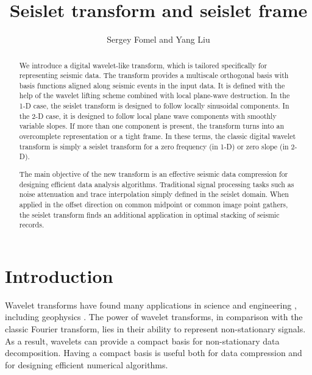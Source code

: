 \title{Seislet transform and seislet frame}
\author{Sergey Fomel and Yang Liu}



\address{Bureau of Economic Geology \\
John A. and Katherine G. Jackson School of Geosciences \\
The University of Texas at Austin \\
University Station, Box X \\
Austin, TX 78713-8924}

\maketitle

\begin{abstract}
  We introduce a digital wavelet-like transform, which is tailored
  specifically for representing seismic data. The transform provides a
  multiscale orthogonal basis with basis functions aligned along
  seismic events in the input data. It is defined with the help of the
  wavelet lifting scheme combined with local plane-wave
  destruction. In the 1-D case, the seislet transform is designed to
  follow locally sinusoidal components. In the 2-D case, it is
  designed to follow local plane wave components with smoothly
  variable slopes. If more than one component is present, the
  transform turns into an overcomplete representation or a {tight}
  frame.  In these terms, the classic digital wavelet transform is
  simply a seislet transform for a zero frequency (in 1-D) or zero
  slope (in 2-D).

  The main objective of the new transform is an {effective} seismic
  data compression for designing efficient data analysis
  algorithms. Traditional signal processing tasks such as noise
  {attenuation} and trace interpolation   simply
  defined in the seislet domain. When applied in the offset direction
  on common midpoint or common image point gathers, the seislet
  transform finds an additional application in optimal stacking of
  seismic records.
\end{abstract}

\section{Introduction}

Wavelet transforms have found many applications in science and engineering 
\cite[]{mallat}, including geophysics \cite[]{SEG-1994-1465,dessing,wapenaar,hesam}. 
The power of wavelet transforms, in comparison with the classic Fourier 
transform, lies in their ability to represent non-stationary signals.  As a 
result, wavelets can provide a compact basis for non-stationary 
data decomposition. Having a compact basis is useful both for data compression 
and for designing efficient numerical algorithms.

